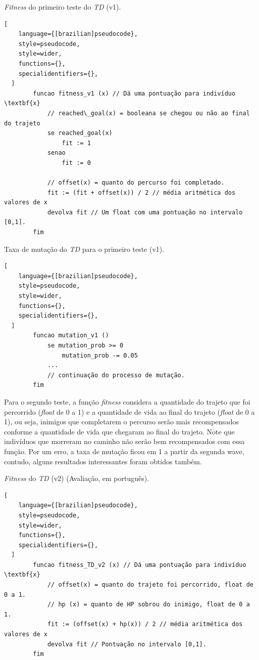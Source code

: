 \begin{programruledcaption}{\textit{Fitness} do primeiro teste do \textit{TD} (v1).\label{prog:avaliacao_TD1}}
  \begin{lstlisting}[
    language={[brazilian]pseudocode},
    style=pseudocode,
    style=wider,
    functions={},
    specialidentifiers={},
  ]
        funcao fitness_v1 (x) // Dá uma pontuação para indivíduo \textbf{x}
            // reached\_goal(x) = booleana se chegou ou não ao final do trajeto
            se reached_goal(x)
                fit := 1
            senao
                fit := 0
            
            // offset(x) = quanto do percurso foi completado.
	        fit := (fit + offset(x)) / 2 // média aritmética dos valores de x
	        devolva fit // Um float com uma pontuação no intervalo [0,1].
        fim
  \end{lstlisting}
\end{programruledcaption}

\begin{programruledcaption}{Taxa de mutação do \textit{TD} para o primeiro teste (v1).\label{prog:mutacao_TD1}}
  \begin{lstlisting}[
    language={[brazilian]pseudocode},
    style=pseudocode,
    style=wider,
    functions={},
    specialidentifiers={},
  ]
        funcao mutation_v1 () 
            se mutation_prob >= 0
		        mutation_prob -= 0.05
		    ...
		    // continuação do processo de mutação.
        fim
  \end{lstlisting}
\end{programruledcaption}

Para o segundo teste, a função \textit{fitness} considera a quantidade do trajeto que foi percorrido (\textit{float} de 0 a 1) e a quantidade de vida ao final do trajeto (\textit{float} de 0 a 1), ou seja, inimigos que completarem o percurso serão mais recompensados conforme a quantidade de vida que chegaram ao final do trajeto. Note que indivíduos que morreram no caminho não serão bem recompensados com essa função. Por um erro, a taxa de mutação ficou em 1 a partir da segunda wave, contudo, alguns resultados interessantes foram obtidos também.

\begin{programruledcaption}{\textit{Fitness} do \textit{TD} (v2) (Avaliação, em português).\label{prog:avaliacao_TD2}}
  \begin{lstlisting}[
    language={[brazilian]pseudocode},
    style=pseudocode,
    style=wider,
    functions={},
    specialidentifiers={},
  ]
        funcao fitness_TD_v2 (x) // Dá uma pontuação para indivíduo \textbf{x}
            // offset(x) = quanto do trajeto foi percorrido, float de 0 a 1.
            // hp (x) = quanto de HP sobrou do inimigo, float de 0 a 1.
	        fit := (offset(x) + hp(x)) / 2 // média aritmética dos valores de x
	        devolva fit // Pontuação no intervalo [0,1].
        fim
  \end{lstlisting}
\end{programruledcaption}


